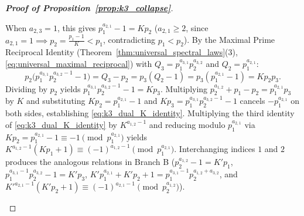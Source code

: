 \documentclass[11pt,a4paper]{article}
\theoremstyle{definition}
\begin{document}
\begin{proof}[\textbf{Proof of Proposition~\ref{prop:k3_collapse}}]
\begin{enumerate}
    When $a_{2,3} = 1$, this gives $p_1^{a_{2,1}} - 1 = K p_2$ ($a_{2,1} \ge 2$, since $a_{2,1} = 1 \implies p_2 = \frac{p_1 - 1}{K} < p_1$, contradicting $p_1 < p_2$). By the Maximal Prime Reciprocal Identity (Theorem~\ref{thm:universal_spectral_laws}(3), \eqref{eq:universal_maximal_reciprocal}) with $Q_3 = p_1^{a_{3,1}} p_2^{a_{3,2}}$ and $Q_2 = p_1^{a_{2,1}}$:
    \[
    p_2\bigl(p_1^{a_{3,1}} p_2^{a_{3,2}-1} - 1\bigr) = Q_3 - p_2 = p_3(Q_2 - 1) = p_3(p_1^{a_{2,1}} - 1) = K p_2 p_3.
    \]
    Dividing by $p_2$ yields $p_1^{a_{3,1}} p_2^{a_{3,2}-1} - 1 = K p_3$. Multiplying $p_2^{a_{1,2}} + p_1 - p_2 = p_1^{a_{2,1}} p_3$ by $K$ and substituting $K p_2 = p_1^{a_{2,1}} - 1$ and $K p_3 = p_1^{a_{3,1}} p_2^{a_{3,2}-1} - 1$ cancels $-p_1^{a_{2,1}}$ on both sides, establishing \eqref{eq:k3_dual_K_identity}. Multiplying the third identity of \eqref{eq:k3_dual_K_identity} by $K^{a_{1,2} - 1}$ and reducing modulo $p_1^{a_{2,1}}$ via $K p_2 = p_1^{a_{2,1}} - 1 \equiv -1 \pmod{p_1^{a_{2,1}}}$ yields $K^{a_{1,2} - 1}(K p_1 + 1) \equiv (-1)^{a_{1,2} - 1} \pmod{p_1^{a_{2,1}}}$. Interchanging indices $1$ and $2$ produces the analogous relations in Branch B ($p_2^{a_{1,2}} - 1 = K' p_1$, $p_1^{a_{3,1}-1} p_2^{a_{3,2}} - 1 = K' p_3$, $K' p_1^{a_{2,1}} + K' p_2 + 1 = p_1^{a_{3,1}-1} p_2^{a_{1,2}+a_{3,2}}$, and $K'^{a_{2,1}-1}(K' p_2 + 1) \equiv (-1)^{a_{2,1}-1} \pmod{p_2^{a_{1,2}}}$).


\end{enumerate}
\end{proof}
\end{document}
